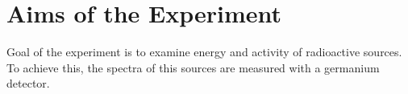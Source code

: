 \section{Aims of the Experiment}
Goal of the experiment is to examine energy and activity
of radioactive sources. To achieve this, the spectra 
of this sources are measured with a germanium detector.
